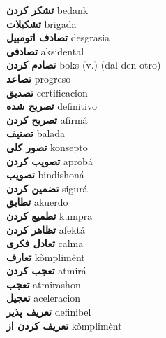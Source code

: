 \textbf{ تشکر کردن  } bedank \\
\textbf{ تشکیلات  } brigada \\
\textbf{ تصادف اتومبیل  } desgrasia \\
\textbf{ تصادفی  } aksidental \\
\textbf{ تصادم کردن  } boks (v.) (dal den otro) \\
\textbf{ تصاعد  } progreso \\
\textbf{ تصدیق  } certificacion \\
\textbf{ تصریح شده  } definitivo \\
\textbf{ تصریح کردن  } afirmá \\
\textbf{ تصنیف  } balada \\
\textbf{ تصور کلی  } konsepto \\
\textbf{ تصویب کردن  } aprobá \\
\textbf{ تصویب  } bindishoná \\
\textbf{ تضمین کردن  } sigurá \\
\textbf{ تطابق  } akuerdo \\
\textbf{ تطمیع کردن  } kumpra \\
\textbf{ تظاهر کردن  } afektá \\
\textbf{ تعادل فکری  } calma \\
\textbf{ تعارف  } kòmplimènt \\
\textbf{ تعجب کردن  } atmirá \\
\textbf{ تعجب  } atmirashon \\
\textbf{ تعجیل  } aceleracion \\
\textbf{ تعریف پذیر  } definibel \\
\textbf{ تعریف کردن از  } kòmplimènt \\
